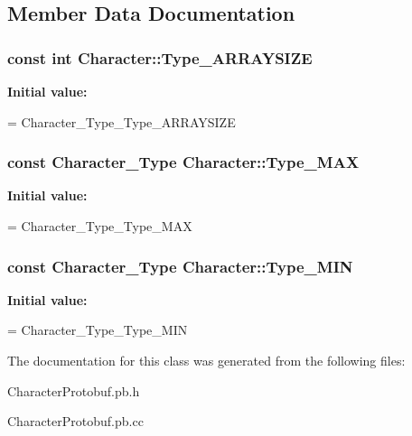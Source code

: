 \subsection{Member Data Documentation}
\subsubsection[{Type\+\_\+\+A\+R\+R\+A\+Y\+S\+I\+ZE}]{\setlength{\rightskip}{0pt plus 5cm}const int Character\+::\+Type\+\_\+\+A\+R\+R\+A\+Y\+S\+I\+ZE\hspace{0.3cm}{\ttfamily [static]}}\hypertarget{classCharacter_aebbe14b69d1e8677ff3be92cb136a33a}{}\label{classCharacter_aebbe14b69d1e8677ff3be92cb136a33a}
{\bfseries Initial value\+:}
\begin{DoxyCode}
=
    Character\_Type\_Type\_ARRAYSIZE
\end{DoxyCode}
\subsubsection[{Type\+\_\+\+M\+AX}]{\setlength{\rightskip}{0pt plus 5cm}const Character\+\_\+\+Type Character\+::\+Type\+\_\+\+M\+AX\hspace{0.3cm}{\ttfamily [static]}}\hypertarget{classCharacter_a26e8e3d6a321a8b7260544c5adeae798}{}\label{classCharacter_a26e8e3d6a321a8b7260544c5adeae798}
{\bfseries Initial value\+:}
\begin{DoxyCode}
=
    Character\_Type\_Type\_MAX
\end{DoxyCode}
\subsubsection[{Type\+\_\+\+M\+IN}]{\setlength{\rightskip}{0pt plus 5cm}const Character\+\_\+\+Type Character\+::\+Type\+\_\+\+M\+IN\hspace{0.3cm}{\ttfamily [static]}}\hypertarget{classCharacter_aba44a2d320ec127135bc06cbf3d5ffb2}{}\label{classCharacter_aba44a2d320ec127135bc06cbf3d5ffb2}
{\bfseries Initial value\+:}
\begin{DoxyCode}
=
    Character\_Type\_Type\_MIN
\end{DoxyCode}


The documentation for this class was generated from the following files\+:\begin{DoxyCompactItemize}
\item 
Character\+Protobuf.\+pb.\+h\item 
Character\+Protobuf.\+pb.\+cc\end{DoxyCompactItemize}
